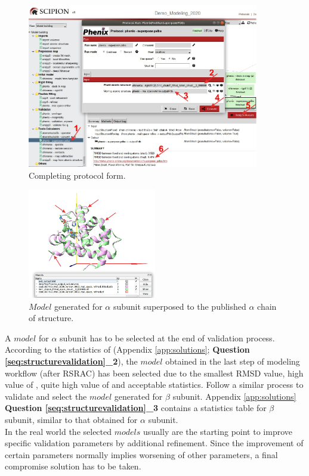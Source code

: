 \begin{itemize}
  \begin{figure}[H]
    \centering 
    \captionsetup{width=.9\linewidth} 
    \includegraphics[width=0.90\textwidth]{Images/Fig37}
    \caption{Completing \phenix {} protocol form.}
    \label{fig:superpose_pdbs_protocol}
    \end{figure}

 
   \begin{figure}[H]
    \centering 
    \captionsetup{width=.9\linewidth} 
    \includegraphics[width=0.50\textwidth]{Images/Fig38}
    \caption{$Model$ generated for  $\alpha$ subunit superposed to the published $\alpha$ chain of  structure.}
    \label{fig:superpose_pdbs_chimera}
   \end{figure}
  
  
  \end{itemize}
 
 A $model$ for  $\alpha$ subunit has to be selected at the end of validation process. According to the statistics of  (Appendix \ref{app:solutions}; \textbf{Question \ref{seq:structurevalidation}\_2}), the $model$ obtained in the last step of modeling workflow ( after RSRAC) has been selected due to the smallest RMSD value, high value of \emringer {}, quite high value of \ccmask and acceptable \molprobity statistics. Follow a similar process to validate and select the $model$ generated for  $\beta$ subunit. Appendix \ref{app:solutions} \textbf{Question \ref{seq:structurevalidation}\_3} contains a statistics table for  $\beta$ subunit, similar to that obtained for  $\alpha$ subunit.\\
 
 In the real world the selected $models$ usually are the starting point to improve specific validation parameters by additional refinement. Since the improvement of certain parameters normally implies worsening of other parameters, a final compromise solution has to be taken.\\

